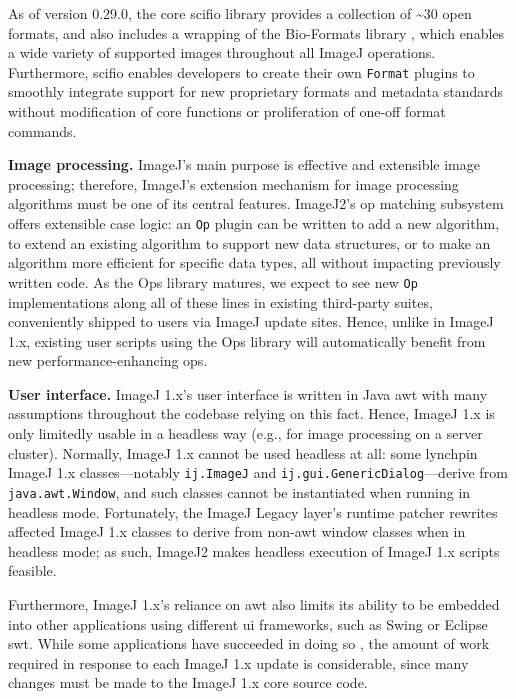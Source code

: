 \documentclass{bmcart}
\begin{document}
As of version 0.29.0, the core \acrshort{scifio} library provides a collection
of \textasciitilde{}30 open formats, and also includes a wrapping of the
Bio-Formats library \cite{bio_formats}, which enables a wide variety of
supported images throughout all ImageJ operations. Furthermore,
\acrshort{scifio} enables developers to create their own \texttt{Format}
plugins to smoothly integrate support for new proprietary formats and metadata
standards without modification of core functions or proliferation of one-off
format commands.

\textbf{Image processing.} ImageJ's main purpose is effective and extensible
image processing; therefore, ImageJ's extension mechanism for image processing
algorithms must be one of its central features. ImageJ2's op
matching subsystem offers extensible case logic: an \texttt{Op} plugin can be
written to add a new algorithm, to extend an existing algorithm to support new
data structures, or to make an algorithm more efficient for specific data
types, all without impacting previously written code. As the Ops library
matures, we expect to see new \texttt{Op} implementations along all of these
lines in existing third-party suites, conveniently shipped to users via ImageJ
update sites. Hence, unlike in ImageJ 1.x, existing user scripts using the Ops
library will automatically benefit from new performance-enhancing ops.

\textbf{User interface.} ImageJ 1.x's user interface is written in Java
\acrshort{awt} with many assumptions throughout the codebase relying on this
fact. Hence, ImageJ 1.x is only limitedly usable in a headless way (e.g., for
image processing on a server cluster). Normally, ImageJ 1.x cannot be used
headless at all: some lynchpin ImageJ 1.x classes---notably \texttt{ij.ImageJ}
and \texttt{ij.gui.GenericDialog}---derive from \texttt{java.awt.Window}, and
such classes cannot be instantiated when running in headless mode. Fortunately,
the ImageJ Legacy layer's runtime patcher rewrites affected ImageJ 1.x classes
to derive from non-\acrshort{awt} window classes when in headless mode; as
such, ImageJ2 makes headless execution of ImageJ 1.x scripts feasible.

Furthermore, ImageJ 1.x's reliance on \acrshort{awt} also limits its ability to
be embedded into other applications using different \acrshort{ui} frameworks,
such as Swing or Eclipse \acrshort{swt}. While some applications have succeeded
in doing so \cite{bio7}, the amount of work required in response to each ImageJ
1.x update is considerable, since many changes must be made to the ImageJ 1.x
core source code.
\end{document}
